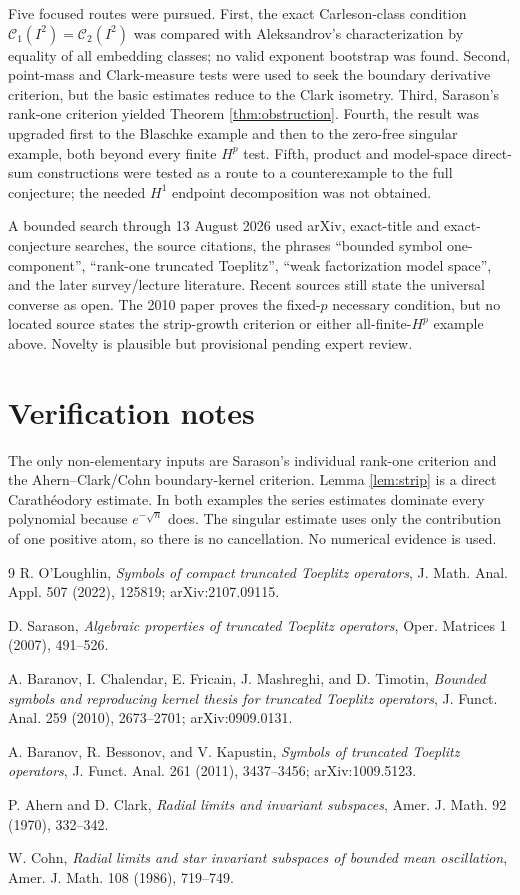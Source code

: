 \documentclass[11pt]{article}
\begin{document}
Five focused routes were pursued.  First, the exact Carleson-class condition
$\mathcal C_1(I^2)=\mathcal C_2(I^2)$ was compared with Aleksandrov's
characterization by equality of all embedding classes; no valid exponent
bootstrap was found.  Second, point-mass and Clark-measure tests were used to
seek the boundary derivative criterion, but the basic estimates reduce to
the Clark isometry.  Third, Sarason's rank-one criterion yielded Theorem
\ref{thm:obstruction}.  Fourth, the result was upgraded first to the Blaschke
example and then to the zero-free singular example, both beyond every finite
$H^p$ test.  Fifth, product and model-space direct-sum constructions were
tested as a route to a counterexample to the full conjecture; the needed
$H^1$ endpoint decomposition was not obtained.

A bounded search through 13 August 2026 used arXiv, exact-title and
exact-conjecture searches, the source citations, the phrases ``bounded symbol
one-component'', ``rank-one truncated Toeplitz'', ``weak factorization model
space'', and the later survey/lecture literature.  Recent sources still state
the universal converse as open.  The 2010 paper \cite{BCFMT} proves the
fixed-$p$ necessary condition, but no located source states the strip-growth
criterion or either all-finite-$H^p$ example above.  Novelty is plausible but
provisional pending expert review.

\section{Verification notes}

The only non-elementary inputs are Sarason's individual rank-one criterion
and the Ahern--Clark/Cohn boundary-kernel criterion.  Lemma
\ref{lem:strip} is a direct Carath\'eodory estimate.  In both examples the
series estimates dominate every polynomial because $e^{-\sqrt n}$ does.
The singular estimate uses only the contribution of one positive atom, so
there is no cancellation.  No numerical evidence is used.

\begin{thebibliography}{9}
R. O'Loughlin,
\emph{Symbols of compact truncated Toeplitz operators},
J. Math. Anal. Appl. 507 (2022), 125819; arXiv:2107.09115.

D. Sarason,
\emph{Algebraic properties of truncated Toeplitz operators},
Oper. Matrices 1 (2007), 491--526.

A. Baranov, I. Chalendar, E. Fricain, J. Mashreghi, and D. Timotin,
\emph{Bounded symbols and reproducing kernel thesis for truncated Toeplitz
operators}, J. Funct. Anal. 259 (2010), 2673--2701; arXiv:0909.0131.

A. Baranov, R. Bessonov, and V. Kapustin,
\emph{Symbols of truncated Toeplitz operators},
J. Funct. Anal. 261 (2011), 3437--3456; arXiv:1009.5123.

P. Ahern and D. Clark,
\emph{Radial limits and invariant subspaces},
Amer. J. Math. 92 (1970), 332--342.

W. Cohn,
\emph{Radial limits and star invariant subspaces of bounded mean
oscillation}, Amer. J. Math. 108 (1986), 719--749.
\end{thebibliography}
\end{document}
